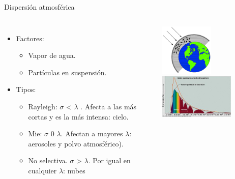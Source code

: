 \documentclass{beamer}
\begin{document}
\begin{frame}{Dispersión atmosférica}
	\begin{columns}
				\begin{itemize}
					\item Factores:
					\begin{itemize}
						\item Vapor de agua.
						\item Partículas en suspensión.
					\end{itemize}
					\item Tipos:
					\begin{itemize}
						\item Rayleigh: $\sigma$ < $\lambda$ . Afecta a las más cortas y es la más intensa: cielo.
						\item Mie: $\sigma$ 0 $\lambda$. Afectan a mayores $\lambda$: aerosoles y polvo atmosférico).
						\item No selectiva. $\sigma$ > $\lambda$. Por igual en cualquier $\lambda$: nubes
					\end{itemize}
					
				\end{itemize}
				\includegraphics[width=0.5\textwidth]{IMGs/dispersion}\\
				\bigskip
				\includegraphics[width=0.7\textwidth]{IMGs/solar_spectrum}
	\end{columns}
\end{frame}
\end{document}
